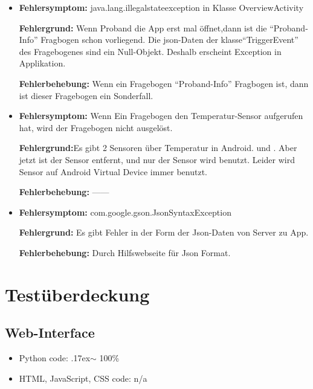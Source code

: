 \documentclass[a4paper]{scrreprt}
\begin{document}
			  \begin{itemize}
				   \item \textbf{Fehlersymptom:} java.lang.illegalstateexception in Klasse OverviewActivity
				  	\par \textbf{Fehlergrund:} Wenn Proband die App erst mal öffnet,dann ist die ``Proband-Info'' Fragbogen schon vorliegend. Die json-Daten der klasse``TriggerEvent'' des Fragebogenes sind ein Null-Objekt. Deshalb erscheint Exception in Applikation.
			  		\par \textbf{Fehlerbehebung:} Wenn ein Fragebogen ``Proband-Info'' Fragbogen ist, dann ist dieser Fragebogen ein Sonderfall.
                  \item \textbf{Fehlersymptom:} Wenn Ein Fragebogen den Temperatur-Sensor aufgerufen hat, wird der Fragebogen nicht ausgel\"ost.
				  \par \textbf{Fehlergrund:}Es gibt 2  Sensoren \"uber Temperatur in Android. {\color{blue}{TYPE-TEMPERATURE }} und {\color{blue}{TYPE-AMBIENT-TEMPERATURE }}. Aber jetzt ist der Sensor {\color{blue}{TYPE-TEMPERATURE }} entfernt, und nur der Sensor {\color{blue}{TYPE-AMBIENT-TEMPERATURE }} wird benutzt. Leider wird Sensor {\color{blue}{TYPE-TEMPERATURE }} auf Android Virtual Device immer benutzt.
			  	  \par\textbf{Fehlerbehebung:} ——

                  \item \textbf{Fehlersymptom:} com.google.gson.JsonSyntaxException
				  \par \textbf{Fehlergrund:} Es gibt Fehler in der Form der Json-Daten von Server zu App.
			  	  \par\textbf{Fehlerbehebung:} Durch Hilfswebseite f\"ur Json Format.


			  \end{itemize}
			
			
		\newpage
		\chapter{Test\"uberdeckung}
			\section{Web-Interface}
			     \begin{itemize}
                     \item Python code: {\raise.17ex\hbox{$\scriptstyle\sim$}} 100\%
                     \item HTML, JavaScript, CSS code: n/a
                 \end{itemize}
			
\end{document}
